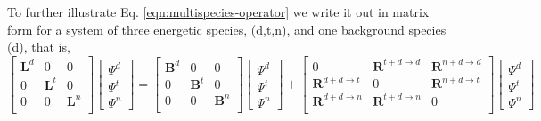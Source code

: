 To further illustrate Eq. \eqref{eqn:multispecies-operator} we write it out in matrix form for a system of three energetic species, (d,t,n), and one background species (d), that is,
\begin{equation}
  \begin{bmatrix}
    \boldsymbol{L}^d & 0 & 0 \\
    0 & \boldsymbol{L}^t & 0 \\
    0 & 0 & \boldsymbol{L}^n \\
  \end{bmatrix}
  \begin{bmatrix}
    \Psi^d \\
    \Psi^t \\
    \Psi^n
  \end{bmatrix}
  =
  \begin{bmatrix}
    \boldsymbol{B}^d & 0 & 0 \\
    0 & \boldsymbol{B}^t & 0 \\
    0 & 0 & \boldsymbol{B}^n \\
  \end{bmatrix}
  \begin{bmatrix}
    \Psi^d \\
    \Psi^t \\
    \Psi^n
  \end{bmatrix}
  +
  \begin{bmatrix}
    0 & \boldsymbol{R}^{t+d\rightarrow d} & \boldsymbol{R}^{n+d\rightarrow d} \\
    \boldsymbol{R}^{d+d\rightarrow t} & 0 & \boldsymbol{R}^{n+d\rightarrow t} \\
    \boldsymbol{R}^{d+d\rightarrow n} & \boldsymbol{R}^{t+d\rightarrow n} & 0 \\
  \end{bmatrix}
  \begin{bmatrix}
    \Psi^d \\
    \Psi^t \\
    \Psi^n
  \end{bmatrix}
\end{equation}



